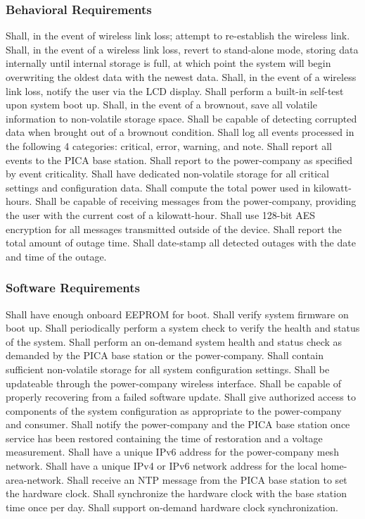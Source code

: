 \subsubsection{Behavioral Requirements}
\begin{outline}[enumerate]
\1 Shall, in the event of wireless link loss; attempt to re-establish the wireless link.
\1 Shall, in the event of a wireless link loss, revert to stand-alone mode, storing data internally until internal storage is full, at which point the system will begin overwriting the oldest data with the newest data.
\1 Shall, in the event of a wireless link loss, notify the user via the LCD display.
\1 Shall perform a built-in self-test upon system boot up.  
\1 Shall, in the event of a brownout, save all volatile information to non-volatile storage space.
\1 Shall be capable of detecting corrupted data when brought out of a brownout condition.
\1 Shall log all events processed in the following 4 categories: critical, error, warning, and note.
\1 Shall report all events to the PICA base station.
\1 Shall report to the power-company as specified by event criticality.
\1 Shall have dedicated non-volatile storage for all critical settings and configuration data.
\1 Shall compute the total power used in kilowatt-hours.
\1 Shall be capable of receiving messages from the power-company, providing the user with the current cost of a kilowatt-hour.
\1 Shall use 128-bit AES encryption for all messages transmitted outside of the device.
\1 Shall report the total amount of outage time.
\1 Shall date-stamp all detected outages with the date and time of the outage.
\end{outline}

\subsubsection{Software Requirements}
\begin{outline}[enumerate]
\1 Shall have enough onboard EEPROM for boot.
\1 Shall verify system firmware on boot up.
\1 Shall periodically perform a system check to verify the health and status of the system.
\1 Shall perform an on-demand system health and status check as demanded by the PICA base station or the power-company.
\1 Shall contain sufficient non-volatile storage for all system configuration settings.
\1 Shall be updateable through the power-company wireless interface.
\1 Shall be capable of properly recovering from a failed software update.
\1 Shall give authorized access to components of the system configuration as appropriate to the power-company and consumer.
\1 Shall notify the power-company and the PICA base station once service has been restored containing the time of restoration and a voltage measurement.
\1 Shall have a unique IPv6 address for the power-company mesh network.
\1 Shall have a unique IPv4 or IPv6 network address for the local home-area-network.
\1 Shall receive an NTP message from the PICA base station to set the hardware clock.
\1 Shall synchronize the hardware clock with the base station time once per day.
\1 Shall support on-demand hardware clock synchronization.
\end{outline}

